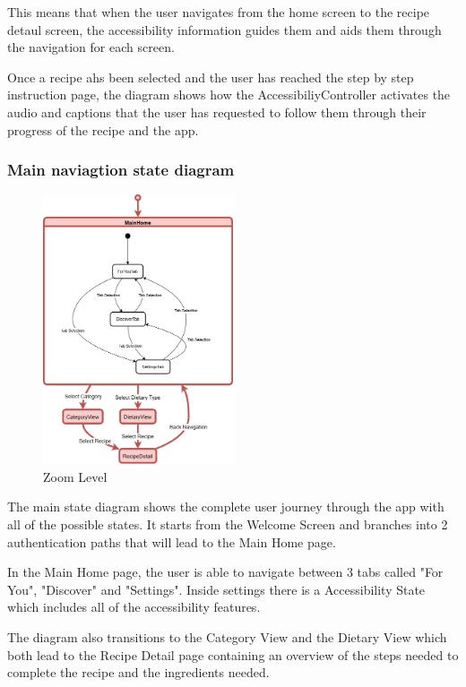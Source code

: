 \documentclass[]{project_final}
\begin{document}
This means that when the user navigates from the home screen to the recipe detaul screen, the accessibility information guides them and aids them through the navigation for each screen.

Once a recipe ahs been selected and the user has reached the step by step instruction page, the diagram shows how the AccessibiliyController activates the audio and captions that the user has requested to follow them through their progress of the recipe and the app.


\newpage
\subsubsection{Main naviagtion state diagram}

\begin{figure}[ht!]
  \centering
  \includegraphics[width=0.5\textwidth]{MainNavigationStateMRA.png}
  \vspace*{0.0cm}
  \caption{Zoom Level}
  \label{fig:1}
\end{figure}

The main state diagram shows the complete user journey through the app with all of the possible states. It starts from the Welcome Screen and branches into 2 authentication paths that will lead to the Main Home page.

In the Main Home page, the user is able to navigate between 3 tabs called "For You", "Discover" and "Settings". Inside settings there is a Accessibility State which includes all of the accessibility features.

The diagram also transitions to the Category View and the Dietary View which both lead to the Recipe Detail page containing an overview of the steps needed to complete the recipe and the ingredients needed.
\end{document}
